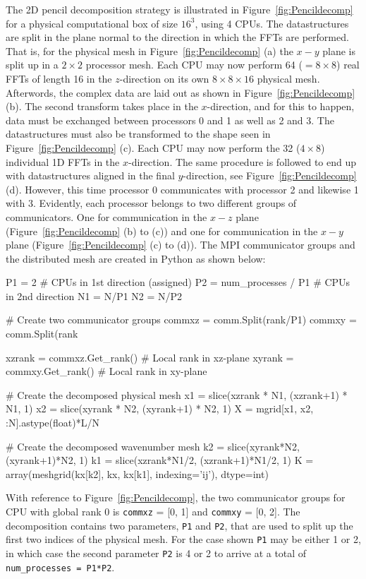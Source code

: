 \documentclass[11pt, oneside]{article}
\newcommand{\inpyth}{\lstinline[keywordstyle={}, basicstyle=\ttfamily]} %[]%
\begin{document}
The 2D pencil decomposition strategy is illustrated in Figure~\ref{fig:Pencildecomp} for a physical computational box of size $16^3$, using 4 CPUs. The datastructures are split in the plane normal to the direction in which the FFTs are performed. That is, for the physical mesh in Figure~\ref{fig:Pencildecomp} (a) the $x-y$ plane is split up in a $2\times2$ processor mesh. Each CPU may now perform 64 ($= 8 \times 8$) real FFTs of length 16 in the $z$-direction on its own $8 \times 8 \times 16$ physical mesh. Afterwords, the complex data are laid out as shown in Figure~\ref{fig:Pencildecomp} (b). The second transform takes place in the $x$-direction, and for this to happen, data must be exchanged between processors 0 and 1 as well as 2 and 3. The datastructures must also be transformed to the shape seen in Figure~\ref{fig:Pencildecomp} (c). Each CPU may now perform the 32 ($4 \times 8$) individual 1D FFTs in the $x$-direction. The same procedure is followed to end up with datastructures aligned in the final $y$-direction, see Figure~\ref{fig:Pencildecomp} (d). However, this time processor 0 communicates with processor 2 and likewise 1 with 3. Evidently, each processor belongs to two different groups of communicators. One for communication in the $x-z$ plane (Figure~\ref{fig:Pencildecomp} (b) to (c)) and one for communication in the $x-y$ plane (Figure~\ref{fig:Pencildecomp} (c) to (d)). The MPI communicator groups and the distributed mesh are created in Python as shown below:

\begin{minipage}{\linewidth}
\begin{python}
P1 = 2                     # CPUs in 1st direction (assigned)
P2 = num_processes / P1    # CPUs in 2nd direction
N1 = N/P1
N2 = N/P2

# Create two communicator groups
commxz = comm.Split(rank/P1)
commxy = comm.Split(rank%

xzrank = commxz.Get_rank() # Local rank in xz-plane
xyrank = commxy.Get_rank() # Local rank in xy-plane

# Create the decomposed physical mesh
x1 = slice(xzrank * N1, (xzrank+1) * N1, 1)
x2 = slice(xyrank * N2, (xyrank+1) * N2, 1)
X = mgrid[x1, x2, :N].astype(float)*L/N

# Create the decomposed wavenumber mesh
k2 = slice(xyrank*N2, (xyrank+1)*N2, 1)
k1 = slice(xzrank*N1/2, (xzrank+1)*N1/2, 1)
K = array(meshgrid(kx[k2], kx, kx[k1], indexing='ij'), dtype=int)
\end{python}
\end{minipage}
With reference to Figure~\ref{fig:Pencildecomp}, the two communicator groups for CPU with global rank 0 is
\inpyth{commxz} = [0, 1] and \inpyth{commxy} = [0, 2]. The decomposition contains two parameters, \inpyth{P1} and \inpyth{P2}, that are used to split up the first two indices of the physical mesh.
For the case shown \inpyth{P1} may be either 1 or 2, in which case the second parameter \inpyth{P2}
is 4 or 2 to arrive at a total of \inpyth{num_processes = P1*P2}.
\end{document}
